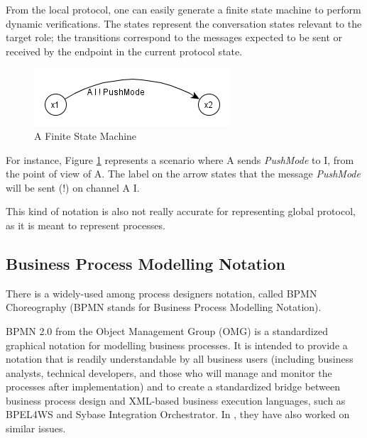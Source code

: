 \documentclass[a4paper,11pt,twoside]{report}
\begin{document}
From the local protocol, one can easily generate a finite state machine to perform dynamic verifications. The states represent the conversation states relevant to the target role; the transitions correspond to the messages expected to be sent or received by the endpoint in the current protocol state.

\begin{figure}[h]
\begin{center}
\includegraphics{fsm}
\end{center}
\caption{A Finite State Machine}
\label{fig:fsm}
\end{figure}
For instance, Figure \ref{fig:fsm} represents a scenario where A sends \emph{PushMode} to I, from the point of view of A. The label on the arrow states that the message \emph{PushMode} will be sent (!) on channel A I.

This kind of notation is also not really accurate for representing global protocol, as it is meant to represent processes.

\subsection{Business Process Modelling Notation}
There is a widely-used among process designers notation, called BPMN Choreography (BPMN stands for Business Process Modelling Notation). 

BPMN 2.0 from the Object Management Group (OMG) \cite{bpmn,bpmnposter} is a standardized graphical notation for modelling business processes. It is intended to provide a notation that is readily understandable by all business users (including business analysts, technical developers, and those who will manage and monitor the processes after implementation) and to create a standardized bridge between business process design and XML-based business execution languages, such as BPEL4WS and Sybase Integration Orchestrator. In \cite{ws}, they have also worked on similar issues.
\end{document}
